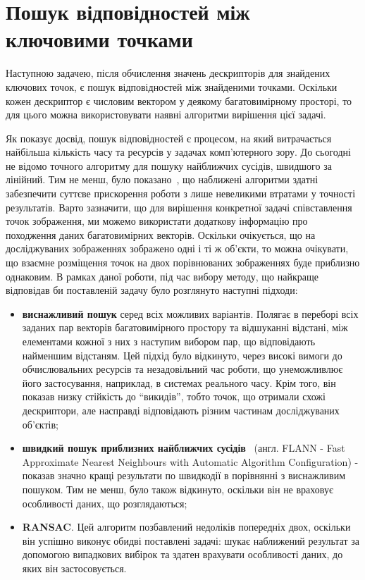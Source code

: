 \section{Пошук відповідностей між ключовими точками}
\label{sec:keypoints}
Наступною задачею, після обчислення значень дескрипторів для знайдених ключових точок, є пошук відповідностей між знайденими точками. Оскільки кожен дескриптор є числовим вектором у деякому багатовимірному просторі, то для цього можна використовувати наявні алгоритми вирішення цієї задачі. 

Як показує досвід, пошук відповідностей є процесом, на який витрачається найбільша кількість часу та ресурсів у задачах комп'ютерного зору. До сьогодні не відомо точного алгоритму для пошуку найближчих сусідів, швидшого за лінійний. Тим не менш, було показано~\cite{muja_flann_2009}, що наближені алгоритми здатні забезпечити суттєве прискорення роботи з лише невеликими втратами у точності результатів. Варто зазначити, що для вирішення конкретної задачі співставлення точок зображення, ми можемо використати додаткову інформацію про походження даних багатовимірних векторів. Оскільки очікується, що на досліджуваних зображеннях зображено одні і ті ж об'єкти, то можна очікувати, що взаємне розміщення точок на двох порівнюваних зображеннях буде приблизно однаковим. В рамках даної роботи, під час вибору методу, що найкраще відповідав би поставленій задачу було розглянуто наступні підходи:

\begin{itemize}
  \item \textbf{виснажливий пошук} серед всіх можливих варіантів. Полягає в переборі всіх заданих пар векторів багатовимірного простору та відшуканні відстані, між елементами кожної з них з наступим вибором пар, що відповідають найменшим відстаням. Цей підхід було відкинуто, через високі вимоги до обчислювальних ресурсів та незадовільний час роботи, що унеможливлює його застосування, наприклад, в системах реального часу. Крім того, він показав низку стійкість до ``викидів'', тобто точок, що отримали схожі дескриптори, але насправді відповідають різним частинам досліджуваних об'єктів;
  \item \textbf{швидкий пошук приблизних найближчих сусідів}~\cite{muja_flann_2009} (англ. FLANN - Fast Approximate Nearest Neighbours with Automatic Algorithm Configuration) - показав значно кращі результати по швидкодії в порівнянні з виснажливим пошуком. Тим не менш, було також відкинуто, оскільки він не враховує особливості даних, що розглядаються;
  \item \textbf{RANSAC}. Цей алгоритм позбавлений недоліків попередніх двох, оскільки він успішно виконує обидві поставлені задачі: шукає наближений результат за допомогою випадкових вибірок та здатен врахувати особливості даних, до яких він застосовується.
\end{itemize}

